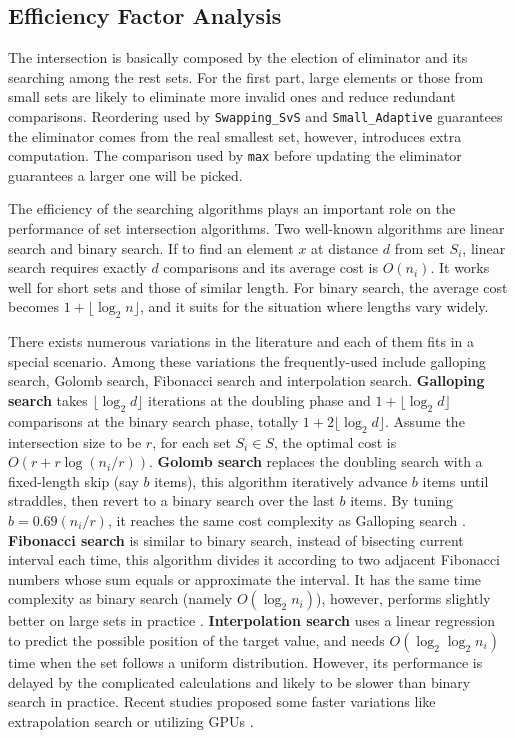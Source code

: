 \documentclass[runningheads,a4paper]{llncs}
\begin{document}
\subsection{Efficiency Factor Analysis}
The intersection is basically composed by the election of eliminator and its searching among the rest sets.
For the first part, large elements or those from small sets are likely to eliminate more invalid ones and reduce redundant comparisons.
Reordering used by \texttt{Swapping\_SvS} and \texttt{Small\_Adaptive} guarantees the eliminator comes from the real smallest set, however, introduces extra computation.
The comparison used by \texttt{max} before updating the eliminator guarantees a larger one will be picked.

The efficiency of the searching algorithms plays an important role on the performance of set intersection algorithms.
Two well-known algorithms are linear search and binary search.
If to find an element $ x $ at distance $ d $ from set $ S_i $, linear search requires exactly $ d $ comparisons and its average cost is $ O(n_i) $.
It works well for short sets and those of similar length.
For binary search, the average cost becomes $ 1 + \lfloor \log_2 n \rfloor $, and it suits for the situation where lengths vary widely.

There exists numerous variations in the literature and each of them fits in a special scenario.
Among these variations the frequently-used include galloping search, Golomb search, Fibonacci search and interpolation search.
\textbf{Galloping search} takes $ \lfloor \log_2 d \rfloor $ iterations at the doubling phase and $ 1 + \lfloor \log_2 d \rfloor $ comparisons at the binary search phase, totally $ 1 + 2 \lfloor \log_2 d \rfloor $.
Assume the intersection size to be $ r $, for each set $ S_i \in S$, the optimal cost is $ O(r+r\log (n_i/r)) $.
\textbf{Golomb search} replaces the doubling search with a fixed-length skip (say $ b $ items), this algorithm iteratively advance $ b $ items until straddles, then revert to a binary search over the last $ b $ items.
By tuning $ b =0.69(n_i/r) $, it reaches the same cost complexity as Galloping search \cite{Hwang1972A}.
\textbf{Fibonacci search} is similar to binary search, instead of bisecting current interval each time, this algorithm divides it according to two adjacent Fibonacci numbers whose sum equals or approximate the interval.
It has the same time complexity as binary search (namely $ O(\log_2 n_i) $), however, performs slightly better on large sets in practice \cite{Kiefer1953Sequential}.
\textbf{Interpolation search} uses a linear regression to predict the possible position of the target value, and needs $ O(\log_2\log_2 n_i) $ time when the set follows a uniform distribution.
However, its performance is delayed by the complicated calculations and likely to be slower than binary search in practice.
Recent studies proposed some faster variations like extrapolation search or utilizing GPUs \cite{Ao2011Efficient,Barbay2003Optimality}.
\end{document}
